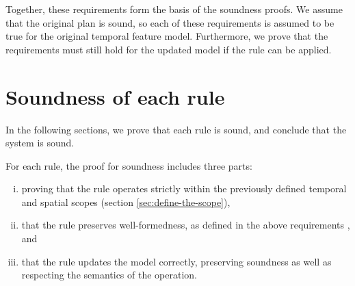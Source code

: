 Together, these requirements form the basis of the soundness proofs. We assume that the original plan is sound, so each of these requirements is assumed to be true for the original temporal feature model. Furthermore, we prove that the requirements must still hold for the updated model if the rule can be applied.

\section{Soundness of each rule}
\label{sec:soundness-of-each-rule}
In the following sections, we prove that each rule is sound, and conclude that the system is sound.

For each rule, the proof for soundness includes three parts: 
\begin{enumerate}[(i)]
   \item proving that the rule operates strictly within the previously defined temporal and spatial scopes (section \vref{sec:define-the-scope}), 
   \item that the rule preserves well-formedness, as defined in the above requirements , and
   \item that the rule updates the model correctly, preserving soundness as well as respecting the semantics of the operation.
\end{enumerate}
